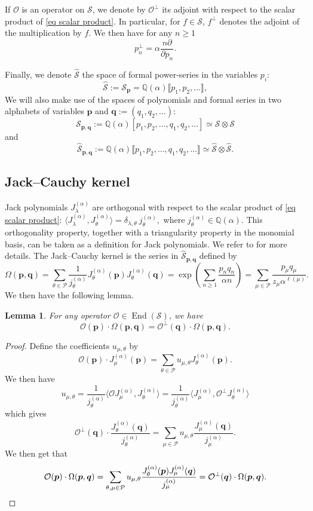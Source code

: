 \documentclass[12pt]{amsart}
\newtheorem{lem}[thm]{Lemma}
\theoremstyle{remark}
\newcommand{\bfp}{\boldsymbol{p}}
\newcommand{\bfq}{\boldsymbol{q}}
\newcommand{\J}{{J}^{(\alpha)}}
\newcommand{\QQ}{\mathbb Q}
\DeclareMathOperator{\End}{End}
\newcommand{\YY}{\mathcal{P}}
\newcommand{\mcO}{\mathcal{O}}
\newcommand{\mcS}{\mathcal{S}}
\newcommand{\mcSh}{\widehat{\mathcal{S}}}
\begin{document}
If $\mcO$ is an operator on $\mcS$, we denote by $\mcO^\perp$ its adjoint with respect to the scalar product of \cref{eq scalar product}. In particular, for  $f\in\mcS$, $f^\perp$ denotes the adjoint of the multiplication by $f$. We then have for any $n\geq 1$
    $$p_n^\perp=\alpha\frac{n\partial}{\partial p_n}.$$

Finally, we denote $\mcSh$ the space of formal power-series in the variables $p_i$:
$$\mcSh:=\mcS_{\bfp}=\QQ(\alpha)\llbracket p_1,p_2,\dots\rrbracket,$$
We will also make use of the spaces of polynomials and formal series in two alphabets of variables $\bfp$ and $\bfq:=(q_1,q_2,\dots)$:
$$\mcS_{\bfp,\bfq}:=\QQ(\alpha)[p_1,p_2,\dots,q_1,q_2,\dots]\simeq \mcS\otimes\mcS$$
and 
$$\mcSh_{\bfp,\bfq}:=\QQ(\alpha)\llbracket p_1,p_2,\dots,q_1,q_2,\dots\rrbracket\simeq \mcSh\otimes\mcSh.$$
\subsection{Jack--Cauchy kernel}
Jack polynomials $\J_\lambda$ are orthogonal with respect to the scalar product of \cref{eq scalar product}:
$\langle \J_\lambda,\J_\theta\rangle=\delta_{\lambda,\theta}\ j^{(\alpha)}_\theta,$
where $j^{(\alpha)}_\theta\in \QQ(\alpha)$.
This orthogonality property, together with a triangularity property in the monomial basis, can be taken as a definition for Jack polynomials. We refer to \cite{Stanley1989} for more details.
The Jack--Cauchy kernel is the series in $\mcSh_{\bfp,\bfq}$ defined by
\begin{equation}\label{eq:Cauchy_kernel}
\Omega(\bfp,\bfq)=\sum_{\theta\in \YY}\frac{1}{j^{(\alpha)}_\theta}J^{(\alpha)}_\theta(\bfp)J^{(\alpha)}_\theta(\bfq)=\exp\left(\sum_{n\geq 1}\frac{p_nq_n}{\alpha n}\right)=\sum_{\mu\in\YY}\frac{p_\mu q_\mu}{z_\mu\alpha^{\ell(\mu)}}.
\end{equation}
We then have the following lemma.
\begin{lem}\label{lem:duality_Cauchy}
    For any operator $\mcO\in\End(\mcS)$, we have
    $$\mcO(\bfp)\cdot \Omega(\bfp,\bfq)=\mcO^\perp(\bfq)\cdot \Omega(\bfp,\bfq).$$
\end{lem}
\begin{proof}
    Define the coefficients $u_{\mu,\theta}$ by 
    $$\mcO(\bfp)\cdot \J_\mu(\bfp)=\sum_{\theta\in\YY}u_{\mu,\theta}\J_\theta(\bfp).$$
    We then have 
    $$u_{\mu,\theta}=\frac{1}{j^{(\alpha)}_\theta}\langle \mcO\J_\mu,\J_\theta\rangle=\frac{1}{j^{(\alpha)}_\theta}\langle \J_\mu,\mcO^\perp\J_\theta\rangle$$
which gives
$$\mcO^\perp(\bfq)\cdot \frac{\J_\theta(\bfq)}{j^{(\alpha)}_\theta}=\sum_{\mu\in\YY}u_{\mu,\theta}\frac{\J_\mu(\bfq)}{j^{(\alpha)}_\mu}.$$
We then get that
\begin{equation*}
  \mcO(\bfp)\cdot \Omega(\bfp,\bfq)=\sum_{\theta,\mu\in\YY}u_{\mu,\theta}\frac{\J_\theta(\bfp)\J_\mu(\bfq)}{j^{(\alpha)}_\mu}=\mcO^\perp(\bfq)\cdot \Omega(\bfp,\bfq).\qedhere  
\end{equation*}
\end{proof}
\end{document}
